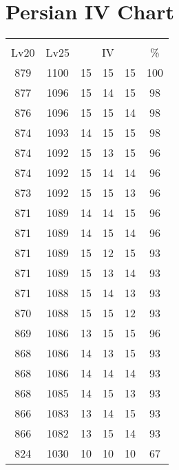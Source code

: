 \documentclass{article}%
\begin{document}
%
\normalsize%
\section{Persian IV Chart}%
\label{sec:Persian IV Chart}%
\renewcommand{\arraystretch}{1.5}%
\begin{tabular}{|c|c|c|c|c|c|}%
\hline%
\multicolumn{6}{|c|}{\textcolor{white}{ 
\linebreak{Persian}
}%
\cellcolor{black}}\\%
\multicolumn{1}{|c}{Lv20}&\multicolumn{1}{c|}{Lv25}&\multicolumn{3}{c|}{IV}&\multicolumn{1}{|c|}{\%}\\%
\hline%
\rowcolor{color100}%
879&1100&15&15&15&100\\%
\hline%
\rowcolor{color98}%
877&1096&15&14&15&98\\%
\hline%
\rowcolor{color98}%
876&1096&15&15&14&98\\%
\hline%
\rowcolor{color98}%
874&1093&14&15&15&98\\%
\hline%
\rowcolor{color96}%
874&1092&15&13&15&96\\%
\hline%
\rowcolor{color96}%
874&1092&15&14&14&96\\%
\hline%
\rowcolor{color96}%
873&1092&15&15&13&96\\%
\hline%
\rowcolor{color96}%
871&1089&14&14&15&96\\%
\hline%
\rowcolor{color96}%
871&1089&14&15&14&96\\%
\hline%
\rowcolor{color93}%
871&1089&15&12&15&93\\%
\hline%
\rowcolor{color93}%
871&1089&15&13&14&93\\%
\hline%
\rowcolor{color93}%
871&1088&15&14&13&93\\%
\hline%
\rowcolor{color93}%
870&1088&15&15&12&93\\%
\hline%
\rowcolor{color96}%
869&1086&13&15&15&96\\%
\hline%
\rowcolor{color93}%
868&1086&14&13&15&93\\%
\hline%
\rowcolor{color93}%
868&1086&14&14&14&93\\%
\hline%
\rowcolor{color93}%
868&1085&14&15&13&93\\%
\hline%
\rowcolor{color93}%
866&1083&13&14&15&93\\%
\hline%
\rowcolor{color93}%
866&1082&13&15&14&93\\%
\hline%
\rowcolor{color91}%
824&1030&10&10&10&67\\%
\end{tabular}

%
\end{document}
